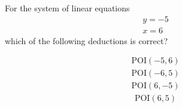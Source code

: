 \documentclass{webquiz}
\begin{document}
\begin{question} %
For the system of linear equations
\begin{gather*}
y=-5\\
x=6
\end{gather*}
which of the following deductions is correct?
\begin{choice}[columns=1] %
\incorrect
\begin{gather*} 
\textrm{POI} (-5,6)
\end{gather*}
\incorrect
\begin{gather*} 
\textrm{POI} (-6,5)
\end{gather*}
\correct
\begin{gather*} 
\textrm{POI} (6,-5)
\end{gather*}
\incorrect
\begin{gather*} 
\textrm{POI} (6,5)
\end{gather*}
\end{choice}
\end{question}
\end{document}
